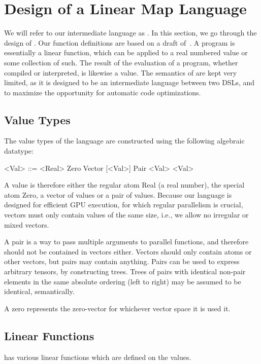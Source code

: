 \section{Design of a Linear Map Language}
We will refer to our intermediate language as \tad{}.
In this section, we go through the design of \tad{}. Our function definitions
are based on a draft of~\cite{popl}. A \tad{} program is essentially a linear
function, which can be applied to a real numbered value or some collection of
such. The result of the evaluation of a \tad{} program, whether compiled or
interpreted, is likewise a value. The semantics of \tad{} are kept very limited,
as it is designed to be an intermediate language between two DSLs, and to
maximize the opportunity for automatic code optimizations.

\subsection{Value Types}
The value types of the language are constructed using the following algebraic datatype:

\begin{grammar}
  <Val> ::= <Real>
  \alt Zero
  \alt Vector [<Val>]
  \alt Pair <Val> <Val>
\end{grammar}



A value is therefore either the regular atom Real
(a real number), the special atom Zero, a vector of values or a pair of values.
Because our language is designed for efficient GPU execution, for which regular
parallelism is crucial, vectors must only contain values of the same size, i.e.,
we allow no irregular or mixed vectors.

A pair is a way to pass multiple arguments to parallel functions, and therefore
should not be contained in vectors either. Vectors should only contain atoms or
other vectors, but pairs may contain anything. Pairs can be used to express
arbitrary tensors, by constructing trees. Trees of pairs with identical non-pair
elements in the same absolute ordering (left to right) may be assumed to be
identical, semantically.

A zero represents the zero-vector for whichever vector space it is used it.

\subsection{Linear Functions}\label{linearmaps}
\tad{} has various linear functions which are defined on the values.

